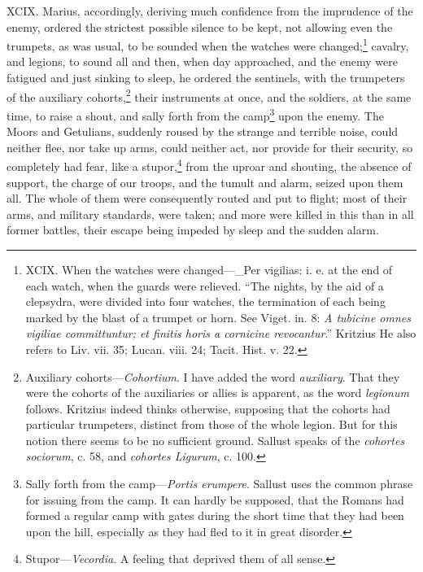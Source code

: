 XCIX. Marius, accordingly, deriving much confidence from the
imprudence of the enemy, ordered the strictest possible silence to be
kept, not allowing even the trumpets, as was usual, to be sounded when
the watches were changed;\footnote{XCIX. When the watches were changed—\_Per vigilias: i. e.
at the end of each watch, when the guards were relieved. ``The nights,
by the aid of a clepsydra, were divided into four watches, the
termination of each being marked by the blast of a trumpet or horn.
See Viget. in. 8: \emph{A tubicine omnes vigiliae committuntur; et finitis
horis a cornicine revocantur}.'' Kritzius He also refers to Liv. vii.
35; Lucan. viii. 24; Tacit. Hist. v. 22.} cavalry, and legions, to sound all and
then, when day approached, and the enemy were fatigued and just
sinking to sleep, he ordered the sentinels, with the trumpeters of the
auxiliary cohorts,\footnote{Auxiliary cohorts—\emph{Cohortium}. I have added the word \emph{auxiliary}.
That they were the cohorts of the auxiliaries or allies is apparent,
as the word \emph{legionum} follows. Kritzius indeed thinks otherwise,
supposing that the cohorts had particular trumpeters, distinct from
those of the whole legion. But for this notion there seems to be no
sufficient ground. Sallust speaks of the \emph{cohortes sociorum}, c. 58,
and \emph{cohortes Ligurum}, c. 100.} their instruments at once, and the soldiers,
at the same time, to raise a shout, and sally forth from the camp\footnote{Sally forth from the camp—\emph{Portis erumpere}. Sallust uses
the common phrase for issuing from the camp. It can hardly be
supposed, that the Romans had formed a regular camp with gates during
the short time that they had been upon the hill, especially as they
had fled to it in great disorder.}
upon the enemy. The Moors and Getulians, suddenly roused by the
strange and terrible noise, could neither flee, nor take up arms,
could neither act, nor provide for their security, so completely had
fear, like a stupor,\footnote{Stupor—\emph{Vecordia}. A feeling that deprived them of all sense.} from the uproar and shouting, the absence of
support, the charge of our troops, and the tumult and alarm, seized
upon them all. The whole of them were consequently routed and put to
flight; most of their arms, and military standards, were taken; and
more were killed in this than in all former battles, their escape
being impeded by sleep and the sudden alarm.

